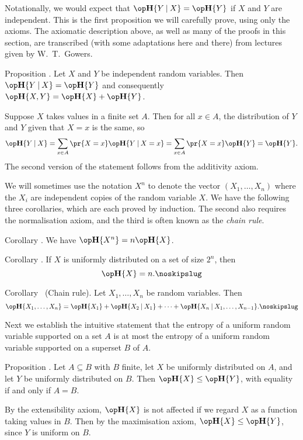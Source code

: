 Notationally, we would expect that $\Eta\{Y\given X\} = \Eta\{Y\}$ if $X$ and $Y$ are independent.
This is the first proposition we will carefully prove, using only the axioms. The axiomatic description above,
as well as many of the proofs in
this section, are transcribed (with some adaptations here and there) from lectures given by W.~T.~Gowers.

\proclaim Proposition \advthm. Let $X$ and $Y$ be independent random variables. Then
$\Eta\{Y\given X\} = \Eta\{Y\}$ and consequently
$\Eta\{X,Y\} = \Eta\{X\} + \Eta\{Y\}$.

\proof Suppose $X$ takes values in a finite set $A$. Then for all $x\in A$, the distribution of
$Y$ and $Y$ given that $X = x$ is the same, so
$$\Eta\{Y \given X\} = \sum_{x\in A} \pr\{X = x\} \Eta\{Y\given X = x\} = \sum_{x\in A} \pr\{X = x\} \Eta\{Y\}
=\Eta\{Y\}.$$
The second version of the statement follows from the additivity axiom.\slug

We will sometimes use the notation $X^n$ to denote the vector $(X_1,\ldots,X_n)$ where the $X_i$
are independent copies of the random variable $X$. We have the following three corollaries, which
are each proved by induction. The second also requires the normalisation axiom,
and the third is often known as the {\it chain rule}.

\edef\corxn{\the\sectcount.\the\thmcount}
\proclaim Corollary \advthm. We have $\Eta\{X^n\} = n\Eta\{X\}$.\slug

\edef\cortwon{\the\sectcount.\the\thmcount}
\proclaim Corollary \advthm. If $X$ is uniformly distributed on a set of size $2^n$, then
$$\Eta\{X\} = n.\noskipslug$$

\parenproclaim Corollary~{\advthm} (Chain rule).
Let $X_1,\ldots,X_n$ be random variables. Then
$$\Eta\{X_1,\ldots,X_n\} = \Eta\{X_1\} + \Eta\{X_2\given X_1\}
+ \cdots+\Eta\{X_n \given X_1,\ldots,X_{n-1}\}.\noskipslug$$

Next we establish the intuitive statement
that the entropy of a uniform random variable supported on a set $A$ is at most
the entropy of a uniform random variable supported on a superset $B$ of $A$.

\edef\propunifineq{\the\sectcount.\the\thmcount}
\proclaim Proposition \advthm. Let $A\subseteq B$ with $B$ finite,
let $X$ be uniformly distributed on $A$, and let $Y$ be uniformly distributed on $B$.
Then $\Eta\{X\} \le \Eta\{Y\}$, with equality if and only if $A = B$.

\proof By the extensibility axiom, $\Eta\{X\}$ is not affected if we regard $X$ as a function
taking values in $B$. Then by the maximisation axiom, $\Eta\{X\}\le \Eta\{Y\}$, since $Y$ is
uniform on $B$.

